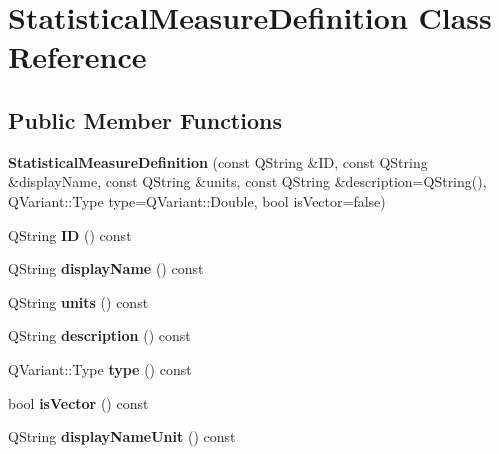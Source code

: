 \hypertarget{class_statistical_measure_definition}{}\section{Statistical\+Measure\+Definition Class Reference}
\label{class_statistical_measure_definition}
\subsection*{Public Member Functions}
\begin{DoxyCompactItemize}
\item 
\mbox{\label{class_statistical_measure_definition_a315e5cba3eb29cbc74d42031432af557}} 
{\bfseries Statistical\+Measure\+Definition} (const Q\+String \&ID, const Q\+String \&display\+Name, const Q\+String \&units, const Q\+String \&description=Q\+String(), Q\+Variant\+::\+Type type=Q\+Variant\+::\+Double, bool is\+Vector=false)
\item 
\mbox{\label{class_statistical_measure_definition_a73e73f61b2c80cd8ffa1bb7608127675}} 
Q\+String {\bfseries ID} () const
\item 
\mbox{\label{class_statistical_measure_definition_ab557ee7dd08665b684268cee85231647}} 
Q\+String {\bfseries display\+Name} () const
\item 
\mbox{\label{class_statistical_measure_definition_a6be9e9ac7ffce6477f25bcb39449b803}} 
Q\+String {\bfseries units} () const
\item 
\mbox{\label{class_statistical_measure_definition_ae5f665f59121c4f79dda4cf831fd4bf1}} 
Q\+String {\bfseries description} () const
\item 
\mbox{\label{class_statistical_measure_definition_a4be0b37577c575a0f0bfdaef957813b4}} 
Q\+Variant\+::\+Type {\bfseries type} () const
\item 
\mbox{\label{class_statistical_measure_definition_add82530720766116041ed0a37147e86e}} 
bool {\bfseries is\+Vector} () const
\item 
\mbox{\label{class_statistical_measure_definition_a2a277578bc3ef8e8f387df2c7e25c51d}} 
Q\+String {\bfseries display\+Name\+Unit} () const
\end{DoxyCompactItemize}


